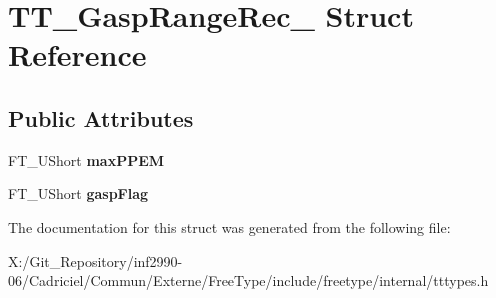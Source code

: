 \hypertarget{struct_t_t___gasp_range_rec__}{\section{T\-T\-\_\-\-Gasp\-Range\-Rec\-\_\- Struct Reference}
\label{struct_t_t___gasp_range_rec__}
}
\subsection*{Public Attributes}
\begin{DoxyCompactItemize}
\item 
\hypertarget{struct_t_t___gasp_range_rec___aa3fab31f6c0659b4deff402e210e15c9}{F\-T\-\_\-\-U\-Short {\bfseries max\-P\-P\-E\-M}}\label{struct_t_t___gasp_range_rec___aa3fab31f6c0659b4deff402e210e15c9}

\item 
\hypertarget{struct_t_t___gasp_range_rec___a9fc298dc0e46d31507728ae25585118d}{F\-T\-\_\-\-U\-Short {\bfseries gasp\-Flag}}\label{struct_t_t___gasp_range_rec___a9fc298dc0e46d31507728ae25585118d}

\end{DoxyCompactItemize}


The documentation for this struct was generated from the following file\-:\begin{DoxyCompactItemize}
\item 
X\-:/\-Git\-\_\-\-Repository/inf2990-\/06/\-Cadriciel/\-Commun/\-Externe/\-Free\-Type/include/freetype/internal/tttypes.\-h\end{DoxyCompactItemize}
